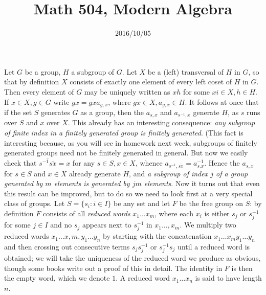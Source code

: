 \documentclass[10pt]{article}
\title{Math 504, Modern Algebra}
\date{2016/10/05}
\begin{document}
\maketitle

Let $G$ be a group, $H$ a subgroup of $G$. Let $X$ be a (left)
transversal of $H$ in $G$, so that by definition $X$ consists of exactly
one element of every left coset of $H$ in $G$. Then every element of $G$
may be uniquely written as $xh$ for some $xi\in X,h\in H$. If $x\in
X,g\in G$ write $gx = \overline{gx}a_{g,x}$, where $\overline{gx}\in
X,a_{g,x}\in H$. It follows at once that if the set $S$ generates $G$ as
a group, then the $a_{s,x}$ and $a_{s^{-1},x}$ generate $H$, as $s$ runs
over $S$ and $x$ over $X$. This already has an interesting consequence:
{\sl any subgroup of finite index in a finitely generated group is
  finitely generated}. (This fact is interesting because, as you will
see in homework next week, subgroups of finitely generated groups need
not be finitely generated in general. But now we easily check that
$\overline{s^{-1}\overline{sx}}= x$ for any $s\in S,x\in X$, whence
$a_{s^{-1},\overline{sx}} = a_{s.x}^{-1}$. Hence the $a_{s,x}$ for $s\in
S$ and $x\in X$ already generate $H$, and {\sl a subgroup of index $j$
  of a group generated by $m$ elements is generated by $jm$ elements}.
Now it turns out that even this result can be improved, but to do so we
need to look first at a very special class of groups. Let $S=\{s_i:i\in
I\}$ be any set and let $F$ be the free group on $S$: by definition $F$
consists of all {\sl reduced words} $x_1\ldots x_m$, where each $x_i$ is
either $s_j$ or $s_j^{-1}$ for some $j\in I$ and no $s_j$ appears next
to $s_j^{-1}$ in $x_1\ldots,x_m$. We multiply two reduced words
$x_1\ldots x,m,y_1\ldots y_n$ by starting with the concatenation
$x_1\ldots x_m y_1\ldots y_n$ and then crossing out consecutive terms
$s_j s_j^{-1}$ or $s_j^{-1} s_j$ until a reduced word is obtained; we
will take the uniqueness of the reduced word we produce as obvious,
though some books write out a proof of this in detail. The identity in
$F$ is then the empty word, which we denote $1$. A reduced word
$x_1\ldots x_n$ is said to have length $n$.
\end{document}
